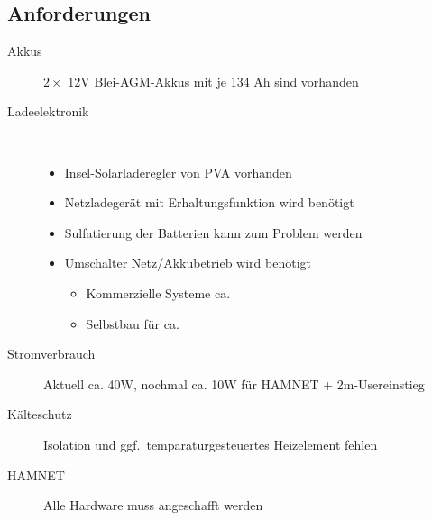 \documentclass[a4paper]{scrartcl}
\begin{document}
\subsection{Anforderungen}
\begin{description}
    \item[Akkus] $2\times$ 12V Blei-AGM-Akkus mit je 134 Ah sind vorhanden
    \item[Ladeelektronik] ~
        \begin{itemize}
            \item Insel-Solarladeregler von PVA vorhanden
            \item Netzladeger\"at mit Erhaltungsfunktion wird ben\"otigt
            \item Sulfatierung der Batterien kann zum Problem werden
            \item Umschalter Netz/Akkubetrieb wird ben\"otigt
                \begin{itemize}
                    \item Kommerzielle Systeme ca. 
                    \item Selbstbau f\"ur ca. 
                \end{itemize}
        \end{itemize}
    \item[Stromverbrauch] Aktuell ca. 40W, nochmal ca. 10W f\"ur HAMNET + 2m-Usereinstieg
    \item[K\"alteschutz] Isolation und ggf.\ temparaturgesteuertes Heizelement fehlen
    \item[HAMNET] Alle Hardware muss angeschafft werden
\end{description}
\end{document}

